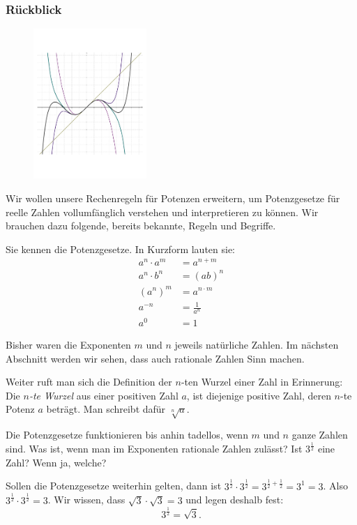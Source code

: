 \documentclass[%
11pt,%
twoside,%
titlepage,%
german,%
headsepline%
]{scrartcl}
\begin{document}
\subsubsection{Rückblick}
  \begin{figure}
  \begin{center}
    \includegraphics[width=0.382\textwidth]{pictures/title}
  \end{center}
\end{figure}
Wir wollen unsere Rechenregeln für Potenzen erweitern, um Potenzgesetze
für reelle Zahlen vollumfänglich verstehen und interpretieren zu können.
Wir brauchen dazu folgende, bereits bekannte, Regeln und Begriffe.
\begin{erin}
  Sie
  kennen die Potenzgesetze. In Kurzform lauten sie:
\begin{align}
  a^n\cdot a^m&=a^{n+m}\\
  a^n\cdot b^n&=(ab)^n\\
  \left(a^n\right)^m&=a^{n\cdot m}\\
  a^{-n}&=\frac{1}{a^n}\\
  a^0&=1
\end{align}

Bisher waren die Exponenten $m$ und $n$ jeweils natürliche Zahlen. Im
nächsten Abschnitt werden wir sehen, dass auch rationale Zahlen Sinn
machen.

Weiter ruft man sich die Definition der $n$-ten Wurzel einer Zahl
in Erinnerung: Die \emph{$n$-te Wurzel} aus einer positiven Zahl
$a$, ist diejenige positive Zahl, deren $n$-te Potenz $a$ beträgt.
Man schreibt dafür $\sqrt[n]{a}$.
\end{erin}

\begin{mot}
  Die Potenzgesetze funktionieren bis anhin tadellos, wenn $m$ und
$n$ ganze Zahlen sind. Was ist, wenn man im Exponenten rationale
Zahlen zulässt? Ist $3^{\frac{1}{2}}$ eine Zahl? Wenn ja, welche?

Sollen die Potenzgesetze weiterhin gelten, dann ist
$3^{\frac{1}{2}}\cdot3^{\frac{1}{2}}=3^{\frac{1}{2}+\frac{1}{2}}=3^1=3$.
Also $3^{\frac{1}{2}}\cdot3^{\frac{1}{2}}=3$. Wir wissen, dass
$\sqrt{3}\cdot\sqrt{3}=3$ und legen deshalb fest:
$$3^{\frac{1}{2}}=\sqrt{3}.$$
\end{mot}
\end{document}
